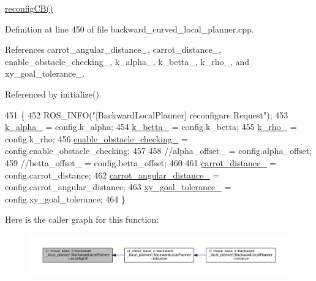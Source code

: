 \hyperlink{classcl__move__base__z_1_1backward__local__planner_1_1BackwardLocalPlanner_a62e4783adae03ce92190d855a021b91d}{reconfig\+C\+B()} 

Definition at line 450 of file backward\+\_\+curved\+\_\+local\+\_\+planner.\+cpp.



References carrot\+\_\+angular\+\_\+distance\+\_\+, carrot\+\_\+distance\+\_\+, enable\+\_\+obstacle\+\_\+checking\+\_\+, k\+\_\+alpha\+\_\+, k\+\_\+betta\+\_\+, k\+\_\+rho\+\_\+, and xy\+\_\+goal\+\_\+tolerance\+\_\+.



Referenced by initialize().


\begin{DoxyCode}
451         \{
452             ROS\_INFO(\textcolor{stringliteral}{"[BackwardLocalPlanner] reconfigure Request"});
453             \hyperlink{classcl__move__base__z_1_1backward__local__planner_1_1BackwardLocalPlanner_abf7a5a56de2ee41afba7e63c0628ec35}{k\_alpha\_} = config.k\_alpha;
454             \hyperlink{classcl__move__base__z_1_1backward__local__planner_1_1BackwardLocalPlanner_a9f257183d87f1d732cb7e404f09905ad}{k\_betta\_} = config.k\_betta;
455             \hyperlink{classcl__move__base__z_1_1backward__local__planner_1_1BackwardLocalPlanner_ad8a36184bfb011545c751109e23d3b98}{k\_rho\_} = config.k\_rho;
456             \hyperlink{classcl__move__base__z_1_1backward__local__planner_1_1BackwardLocalPlanner_a154043366660cc02ec758dda32817511}{enable\_obstacle\_checking\_} = config.enable\_obstacle\_checking;
457 
458             \textcolor{comment}{//alpha\_offset\_ = config.alpha\_offset;}
459             \textcolor{comment}{//betta\_offset\_ = config.betta\_offset;}
460 
461             \hyperlink{classcl__move__base__z_1_1backward__local__planner_1_1BackwardLocalPlanner_a0bbb80ce5bae865c4322869422803296}{carrot\_distance\_} = config.carrot\_distance;
462             \hyperlink{classcl__move__base__z_1_1backward__local__planner_1_1BackwardLocalPlanner_a63e30befa09c4a67cf55086923b760c7}{carrot\_angular\_distance\_} = config.carrot\_angular\_distance;
463             \hyperlink{classcl__move__base__z_1_1backward__local__planner_1_1BackwardLocalPlanner_aa4ec2c87947a3c08f8278eff052e7c8c}{xy\_goal\_tolerance\_} = config.xy\_goal\_tolerance;
464         \}
\end{DoxyCode}
Here is the caller graph for this function\+:
\nopagebreak
\begin{figure}[H]
\begin{center}
\leavevmode
\includegraphics[width=350pt]{classcl__move__base__z_1_1backward__local__planner_1_1BackwardLocalPlanner_a62e4783adae03ce92190d855a021b91d_icgraph}
\end{center}
\end{figure}
